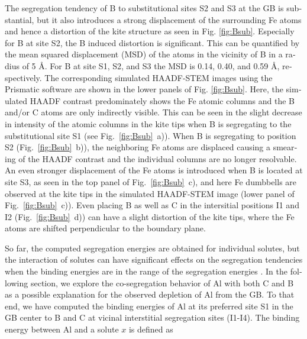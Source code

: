 \documentclass[12pt,a4paper,twoside,twocolumn,english,english]{article}
\begin{document}
\begin{otherlanguage}{english}
The segregation tendency of B to substitutional sites S2 and S3 at the GB is substantial, but it also introduces a strong displacement of the surrounding Fe atoms and hence a distortion of the kite structure as seen in Fig. \ref{fig:Bsub}. Especially for B at site S2, the B induced distortion is significant. This can be quantified by the mean squared displacement (MSD) of the atoms in the vicinity of B in a radius of 5 \AA{}. For B at site S1, S2, and S3 the MSD is 0.14, 0.40, and 0.59 \AA{}, respectively. The corresponding simulated HAADF-STEM images using the Prismatic software \cite{ophus_fast_2017, pryor_streaming_2017} are shown in the lower panels of Fig. \ref{fig:Bsub}. Here, the simulated HAADF contrast predominately shows the Fe atomic columns and the B and/or C atoms are only indirectly visible. This can be seen in the slight decrease in intensity of the atomic columns in the kite tips when B is segregating to the substitutional site S1 (see Fig.~\ref{fig:Bsub}~a)).  When B is segregating to position S2 (Fig.~\ref{fig:Bsub}~b)), the neighboring Fe atoms are displaced causing a smearing of the HAADF contrast and the individual columns are no longer resolvable. An even stronger displacement of the Fe atoms is introduced when B is located at site S3, as seen in the top panel of Fig.~\ref{fig:Bsub}~c), and here Fe dumbbells are observed at the kite tips in the simulated HAADF-STEM image (lower panel of Fig.~\ref{fig:Bsub}~c)). Even placing B as well as C in the intersitial positions I1 and I2 (Fig.~\ref{fig:Bsub}~d)) can have a slight distortion of the kite tips, where the Fe atoms are shifted perpendicular to the boundary plane.      

So far, the computed segregation energies are obtained for individual solutes, but the interaction of solutes can have significant effects on the segregation tendencies when the binding energies are in the range of the segregation energies \cite{aksyonov2016impact,scheiber2018impact}. In the following section, we explore the co-segregation behavior of Al with both C and B as a possible explanation for the observed depletion of Al from the GB. To that end, we have computed the binding energies of Al at its preferred site S1 in the GB center to B and C at vicinal interstitial segregation sites (I1-I4). The binding energy between Al and a solute $x$ is defined as


\end{otherlanguage}
\end{document}
